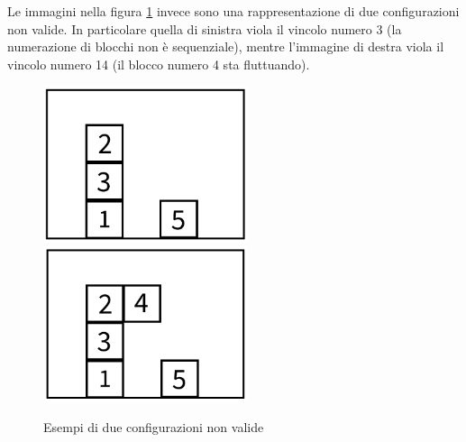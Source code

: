 \documentclass{article}
\begin{document}
	\noindent Le immagini nella figura \ref{fig:non-valid} invece sono una rappresentazione di due configurazioni non valide. In particolare quella di sinistra viola il vincolo numero 3 (la numerazione di blocchi non è sequenziale), mentre l'immagine di destra viola il vincolo numero 14 (il blocco numero 4 sta fluttuando).

	\begin{figure}[H]
	\centering
	\includegraphics[width=6cm]{./images/non-valid-1.png}
	\includegraphics[width=6cm]{./images/non-valid-2.png}
	\caption{Esempi di due configurazioni non valide}
	\label{fig:non-valid}
	\end{figure}
	
\end{document}
